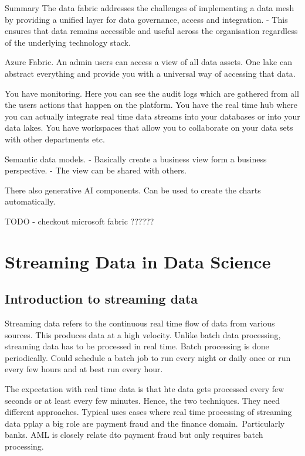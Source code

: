 \documentclass[a4paper, 11pt]{article}
\begin{document}
    Summary
    The data fabric addresses the challenges of implementing a data mesh by providing a unified layer for data governance, access and integration.
    - This ensures that data remains accessible and useful across the organisation regardless of the underlying technology stack.

    Azure Fabric.
    An admin users can access a view of all data assets.
    One lake can abstract everything and provide you with a universal way of accessing that data.

    You have monitoring.
    Here you can see the audit logs which are gathered from all the users actions that happen on the platform.
    You have the real time hub where you can actually integrate real time data streams into your databases or into your data lakes.
    You have workspaces that allow you to collaborate on your data sets with other departments etc.

    Semantic data models.
    - Basically create a business view form a business perspective.
    - The view can be shared with others.

    There also generative AI components.
    Can be used to create the charts automatically.

    TODO - checkout microsoft fabric ??????


    \section{Streaming Data in Data Science}

    \subsection{Introduction to streaming data}

    Streaming data refers to the continuous real time flow of data from various sources.
    This produces data at a high velocity.
    Unlike batch data processing, streaming data has to be processed in real time.
    Batch processing is done periodically.
    Could schedule a batch job to run every night or daily once or run every few hours and at best run every hour.

    The expectation with real time data is that hte data gets processed every few seconds or at least every few minutes.
    Hence, the two techniques.
    They need different approaches.
    Typical uses cases where real time processing of streaming data pplay a big role are payment fraud and the finance domain.\ Particularly banks.
    AML is closely relate dto payment fraud but only requires batch processing.
\end{document}
